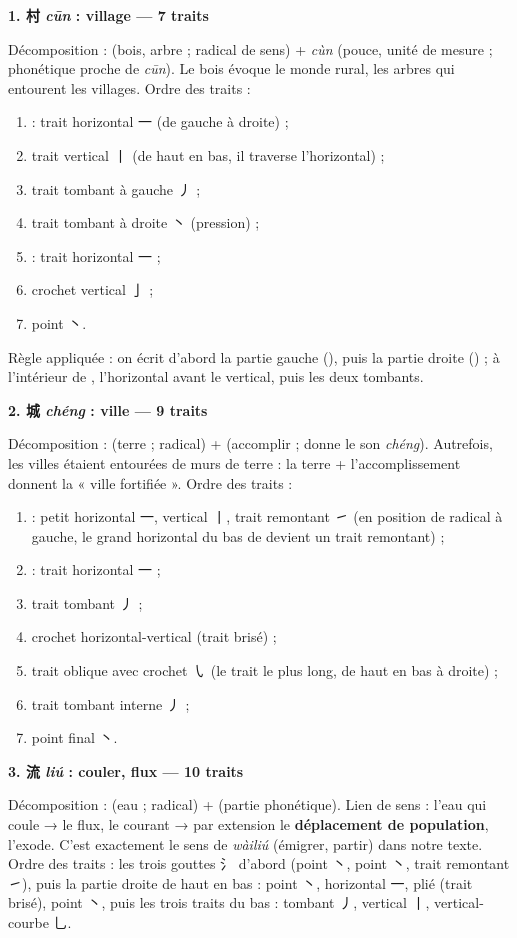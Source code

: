 \documentclass[11pt]{article}
\newcommand{\zh}[1]{\ifmmode\text{#1}\else{#1}\fi}
\begin{document}
\textbf{1. 村 \emph{cūn} : village — 7 traits}\par
Décomposition : \zh{木} (bois, arbre ; radical de sens) + \zh{寸} \emph{cùn} (pouce, unité de mesure ; phonétique proche de \emph{cūn}). Le bois évoque le monde rural, les arbres qui entourent les villages. Ordre des traits :
\begin{enumerate}
\item \zh{木} : trait horizontal 一 (de gauche à droite) ;
\item trait vertical 丨 (de haut en bas, il traverse l'horizontal) ;
\item trait tombant à gauche 丿 ;
\item trait tombant à droite 丶 (pression) ;
\item \zh{寸} : trait horizontal 一 ;
\item crochet vertical 亅 ;
\item point 丶.
\end{enumerate}
Règle appliquée : on écrit d'abord la partie gauche (\zh{木}), puis la partie droite (\zh{寸}) ; à l'intérieur de \zh{木}, l'horizontal avant le vertical, puis les deux tombants.

\textbf{2. 城 \emph{chéng} : ville — 9 traits}\par
Décomposition : \zh{土} (terre ; radical) + \zh{成} (accomplir ; donne le son \emph{chéng}). Autrefois, les villes étaient entourées de murs de terre : la terre + l'accomplissement donnent la « ville fortifiée ». Ordre des traits :
\begin{enumerate}
\item \zh{土} : petit horizontal 一, vertical 丨, trait remontant ㇀ (en position de radical à gauche, le grand horizontal du bas de \zh{土} devient un trait remontant) ;
\item \zh{成} : trait horizontal 一 ;
\item trait tombant 丿 ;
\item crochet horizontal-vertical (trait brisé) ;
\item trait oblique avec crochet ㇂ (le trait le plus long, de haut en bas à droite) ;
\item trait tombant interne 丿 ;
\item point final 丶.
\end{enumerate}

\textbf{3. 流 \emph{liú} : couler, flux — 10 traits}\par
Décomposition : \zh{氵} (eau ; radical) + \zh{㐬} (partie phonétique). Lien de sens : l'eau qui coule → le flux, le courant → par extension le \textbf{déplacement de population}, l'exode. C'est exactement le sens de \zh{外流} \emph{wàiliú} (émigrer, partir) dans notre texte. Ordre des traits : les trois gouttes 氵 d'abord (point 丶, point 丶, trait remontant ㇀), puis la partie droite de haut en bas : point 丶, horizontal 一, plié (trait brisé), point 丶, puis les trois traits du bas : tombant 丿, vertical 丨, vertical-courbe 乚.
\end{document}
